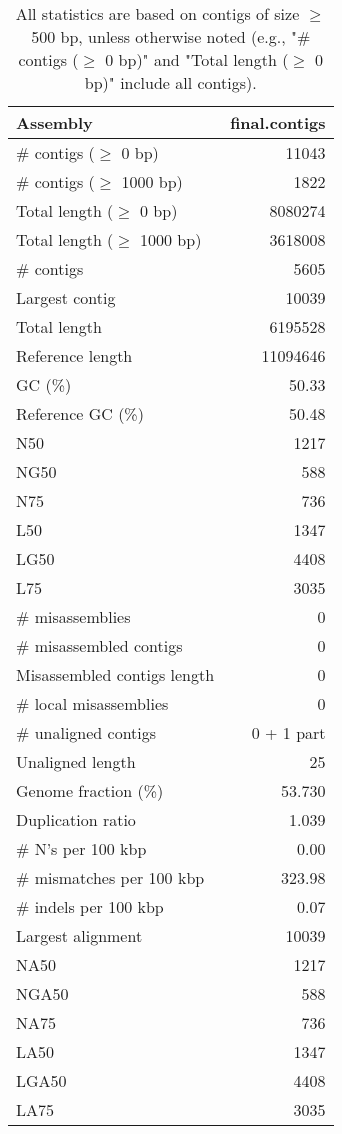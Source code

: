 \documentclass[12pt,a4paper]{article}
\begin{document}
\begin{table}[ht]
\begin{center}
\caption{All statistics are based on contigs of size $\geq$ 500 bp, unless otherwise noted (e.g., "\# contigs ($\geq$ 0 bp)" and "Total length ($\geq$ 0 bp)" include all contigs).}
\begin{tabular}{|l*{1}{|r}|}
\hline
Assembly & final.contigs \\ \hline
\# contigs ($\geq$ 0 bp) & 11043 \\ \hline
\# contigs ($\geq$ 1000 bp) & 1822 \\ \hline
Total length ($\geq$ 0 bp) & 8080274 \\ \hline
Total length ($\geq$ 1000 bp) & 3618008 \\ \hline
\# contigs & 5605 \\ \hline
Largest contig & 10039 \\ \hline
Total length & 6195528 \\ \hline
Reference length & 11094646 \\ \hline
GC (\%) & 50.33 \\ \hline
Reference GC (\%) & 50.48 \\ \hline
N50 & 1217 \\ \hline
NG50 & 588 \\ \hline
N75 & 736 \\ \hline
L50 & 1347 \\ \hline
LG50 & 4408 \\ \hline
L75 & 3035 \\ \hline
\# misassemblies & 0 \\ \hline
\# misassembled contigs & 0 \\ \hline
Misassembled contigs length & 0 \\ \hline
\# local misassemblies & 0 \\ \hline
\# unaligned contigs & 0 + 1 part \\ \hline
Unaligned length & 25 \\ \hline
Genome fraction (\%) & 53.730 \\ \hline
Duplication ratio & 1.039 \\ \hline
\# N's per 100 kbp & 0.00 \\ \hline
\# mismatches per 100 kbp & 323.98 \\ \hline
\# indels per 100 kbp & 0.07 \\ \hline
Largest alignment & 10039 \\ \hline
NA50 & 1217 \\ \hline
NGA50 & 588 \\ \hline
NA75 & 736 \\ \hline
LA50 & 1347 \\ \hline
LGA50 & 4408 \\ \hline
LA75 & 3035 \\ \hline
\end{tabular}
\end{center}
\end{table}
\end{document}
